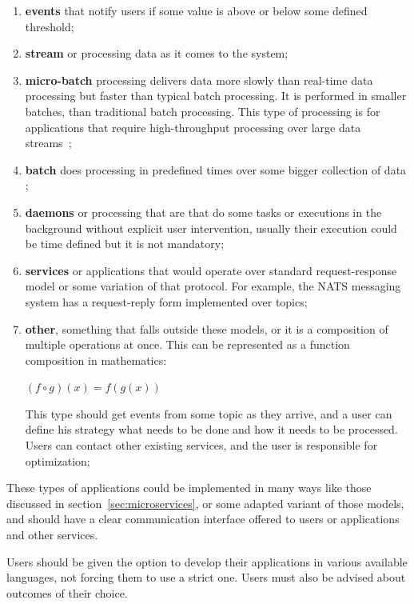 \begin{enumerate}[start=1,label={(\bfseries \arabic*)}]
	\item \textbf{events} that notify users if some value is above or below some defined threshold; 
	\item \textbf{stream} or processing data as it comes to the system;
	\item \textbf{micro-batch} processing delivers data more slowly than real-time data processing but faster than typical batch processing. It is performed in smaller batches, than traditional batch processing. This type of processing is for applications that require high-throughput processing over large data streams~\cite{AbdelhamidMDA20};
	\item \textbf{batch} does processing in predefined times over some bigger collection of data ;
	\item \textbf{daemons} or processing that are that do some tasks or executions in the background without explicit user intervention, usually their execution could be time defined but it is not mandatory;
	\item \textbf{services} or applications that would operate over standard request-response model or some variation of that protocol. For example, the NATS messaging system has a request-reply form implemented over topics;
	\item \textbf{other}, something that falls outside these models, or it is a composition of multiple operations at once. This can be represented as a function composition in mathematics:
	
	\begin{center}
		\( (f \circ g)(x) = f(g(x))\) 
	\end{center}
	
	This type should get events from some topic as they arrive, and a user can define his strategy what needs to be done and how it needs to be processed. Users can contact other existing services, and the user is responsible for optimization;
\end{enumerate}

\noindent
These types of applications could be implemented in many ways like those discussed in section~\ref{sec:microservices}, or some adapted variant of those models, and should have a clear communication interface offered to users or applications and other services. 

Users should be given the option to develop their applications in various available languages, not forcing them to use a strict one. Users must also be advised about outcomes of their choice. 

